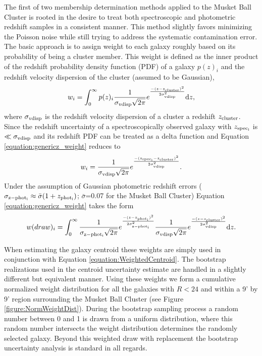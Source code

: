 The first of two membership determination methods applied to the Musket Ball Cluster is rooted in the desire to treat both spectroscopic and photometric redshift samples in a consistent manner. 
This method slightly favors minimizing the Poisson noise while still trying to address the systematic contamination error. 
The basic approach is to assign weight to each galaxy roughly based on its probability of being a cluster member.
This weight is defined as the inner product of the redshift probability density function (PDF) of a galaxy $p(z)_i$ and the redshift velocity dispersion of the cluster (assumed to be Gaussian),
\begin{equation}
w_i = \int_{0}^{\infty} p(z)_i \frac{1}{\sigma_{\rm vdisp}\sqrt{2\pi}}e^{\frac{-(z-z_{\rm cluster})^2}{2\sigma_{\rm vdisp}^2}}\mathrm{d}z,
\label{equation:genericz_weight}
\end{equation}
where $\sigma_{\rm vdisp}$ is the redshift velocity dispersion of a cluster a redshift $z_{\rm cluster}$.
Since the redshift uncertainty of a spectroscopically observed galaxy with $z_{\rm spec_{i}}$ is $\ll \sigma_{\rm vdisp}$ and its redshift PDF can be treated as a delta function and Equation \ref{equation:genericz_weight} reduces to
\begin{equation}
w_i = \frac{1}{\sigma_{\rm vdisp}\sqrt{2\pi}}e^{\frac{-(z_{\rm spec_{i}}-z_{\rm cluster})^2}{2\sigma_{\rm vdisp}^2}}.
\end{equation}\label{equation:specz_weight}
Under the assumption of Gaussian photometric redshift errors ($\sigma_{\rm z-phot_{i}} \approx \bar{\sigma}(1+z_{\rm phot_{i}})$; $\bar{\sigma}$=0.07 for the Musket Ball Cluster) Equation \ref{equation:genericz_weight} takes the form
\begin{equation}
w(draw)_i = \int_{0}^{\infty} \frac{1}{\sigma_{\rm z-phot_{i}}\sqrt{2\pi}}e^{\frac{-(z-z_{\rm phot_{i}})^2}{2\sigma_{\rm z-phot_{i}}^2}} \frac{1}{\sigma_{\rm vdisp}\sqrt{2\pi}}e^{\frac{-(z-z_{\rm cluster})^2}{2\sigma_{\rm vdisp}^2}}\mathrm{d}z.
\label{equation:photoz_weight}
\end{equation}

When estimating the galaxy centroid these weights are simply used in conjunction with Equation \ref{equation:WeightedCentroid}.
The bootstrap realizations used in the centroid uncertainty estimate are handled in a slightly different but equivalent manner.
Using these weights we form a cumulative normalized weight distribution for all the galaxies with $R<24$ and within a 9' by 9' region surrounding the Musket Ball Cluster (see Figure \ref{figure:NormWeightDist}).
During the bootstrap sampling process a random number between 0 and 1 is drawn from a uniform distribution, where this random number intersects the weight distribution determines the randomly selected galaxy.
Beyond this weighted draw with replacement the bootstrap uncertainty analysis is standard in all regards.


